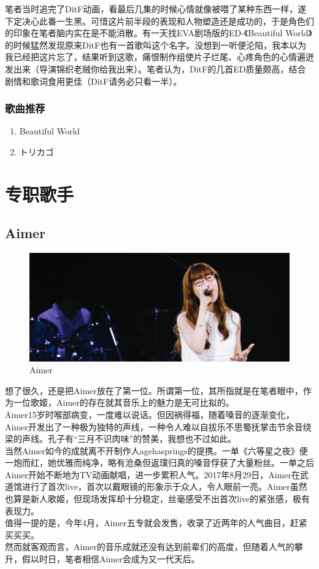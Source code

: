 \documentclass{ctexart}
\begin{document}
笔者当时追完了DitF动画，看最后几集的时候心情就像被喂了某种东西一样，遂下定决心此番一生黑。可惜这片前半段的表现和人物塑造还是成功的，于是角色们的印象在笔者脑内实在是不能消散。有一天找EVA剧场版的ED-《Beautiful World》的时候猛然发现原来DitF也有一首歌叫这个名字。没想到一听便沦陷，我本以为我已经把这片忘了，结果听到这歌，痛恨制作组使片子烂尾、心疼角色的心情遍迸发出来（导演锦织老贼你给我出来）。笔者认为，DitF的几首ED质量颇高，结合剧情和歌词食用更佳（DitF请务必只看一半）。

\subsubsection*{歌曲推荐}
\begin{enumerate}
\item Beautiful World
\item トリカゴ
\end{enumerate}

\section{专职歌手}
\subsection{Aimer}

\begin{figure}[h]
\centering
 \includegraphics[width=1.0\textwidth]{Aimer.jpg}
 \caption{Aimer}
\end{figure}

想了很久，还是把Aimer放在了第一位。所谓第一位，其所指就是在笔者眼中，作为一位歌姬，Aimer的存在就其音乐上的魅力是无可比拟的。\\
Aimer15岁时喉部病变，一度难以说话。但因祸得福，随着嗓音的逐渐变化，Aimer开发出了一种极为独特的声线，一种令人难以自拔乐不思蜀抚掌击节余音绕梁的声线。孔子有“三月不识肉味”的赞美，我想也不过如此。\\
当然Aimer如今的成就离不开制作人agehasprings的提携。一单《六等星之夜》便一炮而红，她优雅而纯净，略有沧桑但返璞归真的嗓音俘获了大量粉丝。一单之后Aimer开始不断地为TV动画献唱，进一步累积人气。2017年8月29日，Aimer在武道馆进行了首次live，首次以戴眼镜的形象示于众人，令人眼前一亮。Aimer虽然也算是新人歌姬，但现场发挥却十分稳定，丝毫感受不出首次live的紧张感，极有表现力。\\
值得一提的是，今年4月，Aimer五专就会发售，收录了近两年的人气曲目，赶紧买买买。\\
然而就客观而言，Aimer的音乐成就还没有达到前辈们的高度，但随着人气的攀升，假以时日，笔者相信Aimer会成为又一代天后。\\
\end{document}

